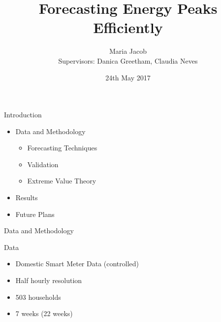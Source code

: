 \documentclass{beamer}
\title[Your Short Title]{Forecasting Energy Peaks Efficiently}
\author[Jacob]{Maria Jacob\\ {\small Supervisors: Danica Greetham, Claudia Neves}}
\institute{Mathematics of Planet Earth}
\date{24th May 2017}
\begin{document}
\begin{frame}
  \titlepage
\end{frame}



\begin{frame}{Introduction}

\begin{itemize}
\item Data and Methodology \begin{itemize} \item Forecasting Techniques
\item Validation
\item Extreme Value Theory \end{itemize}
\item Results
\item Future Plans
\end{itemize}


\end{frame}

\begin{frame}[plain,c]

\begin{center}
\Huge Data and Methodology
\end{center}

\end{frame}

\begin{frame}{Data}
\begin{itemize}
\item Domestic Smart Meter Data (controlled)
\item Half hourly resolution
\item 503 households
\item 7 weeks (22 weeks)
\end{itemize}
\end{frame}
\end{document}
